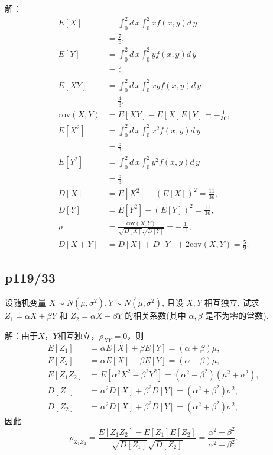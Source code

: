 \documentclass[UTF8,a4paper,10pt]{ctexart}
\def\deriv{d\,}
\begin{document}
解：
\begin{align}
    E[X] &= \int_{0}^2\deriv x\int_0^2xf(x,y)\deriv y \nonumber \\
         &= \frac{7}{6}, \\
    E[Y] &= \int_{0}^2\deriv x\int_0^2yf(x,y)\deriv y \nonumber \\
         &= \frac{7}{6}, \\
    E[XY] &= \int_{0}^2\deriv x\int_0^2xyf(x,y)\deriv y \nonumber \\
          &= \frac{4}{3}, \\
    \mathrm{cov}(X,Y) &= E[XY] - E[X]E[Y] = -\frac{1}{36}, \\
    E[X^2] &= \int_{0}^2\deriv x\int_0^2x^2f(x,y)\deriv y \nonumber \\
           &= \frac{5}{3}, \\
    E[Y^2] &= \int_{0}^2\deriv x\int_0^2y^2f(x,y)\deriv y \nonumber \\
           &= \frac{5}{3}, \\
    D[X] &= E[X^2] - (E[X])^2 = \frac{11}{36}, \\
    D[Y] &= E[Y^2] - (E[Y])^2 = \frac{11}{36}, \\
    \rho &= \frac{\mathrm{cov}(X, Y)}{\sqrt{D[X]}\sqrt{D[Y]}} = -\frac{1}{11}, \\
    D[X + Y] &= D[X] + D[Y] + 2\mathrm{cov}(X, Y) = \frac{5}{9}.
\end{align}


\subsection{p119/33}
设随机变量 $X \sim N\left(\mu, \sigma^{2}\right), Y \sim N\left(\mu, \sigma^{2}\right)$, 且设 $X, Y$ 相互独立, 试求 $Z_{1}=\alpha X+\beta Y$ 和 $Z_{2}=\alpha X-\beta Y$ 的相关系数(其中 $\alpha, \beta$ 是不为零的常数).

解：由于$X$，$Y$相互独立，$\rho_{XY} = 0$，则
\begin{align}
    E[Z_1] &= \alpha E[X] + \beta E[Y] = (\alpha + \beta)\mu, \\
    E[Z_2] &= \alpha E[X] - \beta E[Y] = (\alpha - \beta)\mu, \\
    E[Z_1Z_2] &= E[\alpha^2X^2 - \beta^2 Y^2] = (\alpha^2 - \beta^2)(\mu^2 + \sigma^2), \\
    D[Z_1] &= \alpha^2 D[X] + \beta^2 D[Y] = (\alpha^2 + \beta^2)\sigma^2, \\
    D[Z_2] &= \alpha^2 D[X] + \beta^2 D[Y] = (\alpha^2 + \beta^2)\sigma^2,
\end{align}
因此
\begin{equation}
    \rho_{Z_1Z_2} = \frac{E[Z_1Z_2] - E[Z_1]E[Z_2]}{\sqrt{D[Z_1]}\sqrt{D[Z_2]}} =\frac{\alpha^2 - \beta^2}{\alpha^2 + \beta^2}.
\end{equation}
\end{document}
